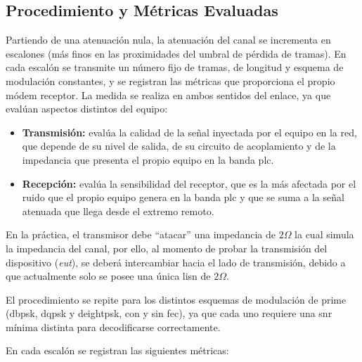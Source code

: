 \subsection{Procedimiento y Métricas Evaluadas}
\label{subsec:procedimiento_sensibilidad}

Partiendo de una atenuación nula, la atenuación del canal se incrementa en escalones (más finos en las proximidades del umbral de pérdida de tramas). En cada escalón se transmite un número fijo de tramas, de longitud y esquema de modulación constantes, y se registran las métricas que proporciona el propio módem receptor. La medida se realiza en ambos sentidos del enlace, ya que evalúan aspectos distintos del equipo:

\begin{itemize}
    \item \textbf{Transmisión:} evalúa la calidad de la señal inyectada por el equipo en la red, que depende de su nivel de salida, de su circuito de acoplamiento y de la impedancia que presenta el propio equipo en la banda \gls{plc}.
    \item \textbf{Recepción:} evalúa la sensibilidad del receptor, que es la más afectada por el ruido que el propio equipo genera en la banda \gls{plc} y que se suma a la señal atenuada que llega desde el extremo remoto.
\end{itemize}

En la práctica, el transmisor debe ``atacar'' una impedancia de $2\Omega$ la cual simula la impedancia del canal, por ello, al momento de probar la transmisión del dispositivo (\textit{\gls{eut}}), se deberá intercambiar hacia el lado de transmisión, debido a que actualmente solo se posee una única \gls{lisn} de $2\Omega$. 

El procedimiento se repite para los distintos esquemas de modulación de \gls{prime} (\gls{dbpsk}, \gls{dqpsk} y \gls{deightpsk}, con y sin \gls{fec}), ya que cada uno requiere una \gls{snr} mínima distinta para decodificarse correctamente.

En cada escalón se registran las siguientes métricas:


